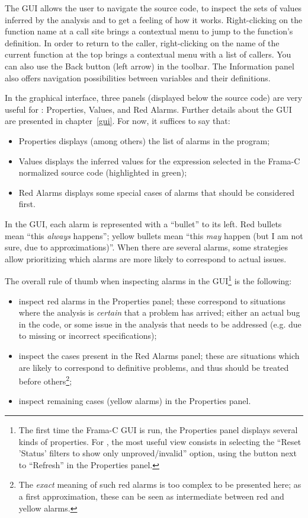 \documentclass{frama-c-book}
\begin{document}
The GUI allows the user to navigate the source code, to inspect the sets of
values inferred by the analysis and to get
a feeling of how it works. Right-clicking on the function name
at a call site brings a contextual menu to jump
to the function's definition.
In order to return to the caller,
right-clicking on the name of the current function at the top
brings a contextual menu with a list of callers.
You can also use the Back button (left arrow) in the toolbar.
The Information panel also offers navigation possibilities between
variables and their definitions.

In the graphical interface, three panels (displayed below the
source code) are very useful for \Eva{}: Properties, Values, and
Red Alarms. Further details about the GUI are presented in chapter~\ref{gui}.
For now, it suffices to say that:

\begin{itemize}
\item Properties displays (among others) the list of alarms in the program;
\item Values displays the inferred values for the expression selected in the
  Frama-C normalized source code (highlighted in green);
\item Red Alarms displays some special cases of alarms that should be considered
  first.
\end{itemize}

In the GUI, each alarm is represented with a ``bullet'' to its left.
Red bullets mean ``this {\em always} happens''; yellow
bullets mean ``this {\em may} happen (but I am not sure, due to
approximations)''. When there are several alarms, some strategies allow
prioritizing which alarms are more likely to correspond to actual issues.

The overall rule of thumb when inspecting alarms in the GUI\footnote{The first
  time the Frama-C GUI is run, the Properties panel displays several kinds of
  properties. For \Eva{}, the most useful view consists in selecting the
  ``Reset 'Status' filters to show only unproved/invalid'' option, using the
  button next to ``Refresh'' in the Properties panel.} is the following:

\begin{itemize}
\item inspect red alarms in the Properties panel; these correspond to
  situations where the analysis is {\em certain} that a problem has arrived;
  either an actual bug in the code, or some issue in the analysis that needs to
  be addressed (e.g. due to missing or incorrect specifications);
\item inspect the cases present in the Red Alarms panel; these are situations
  which are likely to correspond to definitive problems, and thus should be
  treated before others\footnote{The {\em exact} meaning of such red alarms is
    too complex to be presented here; as a first approximation, these can be
    seen as intermediate between red and yellow alarms.};
\item inspect remaining cases (yellow alarms) in the Properties panel.
\end{itemize}
\end{document}
